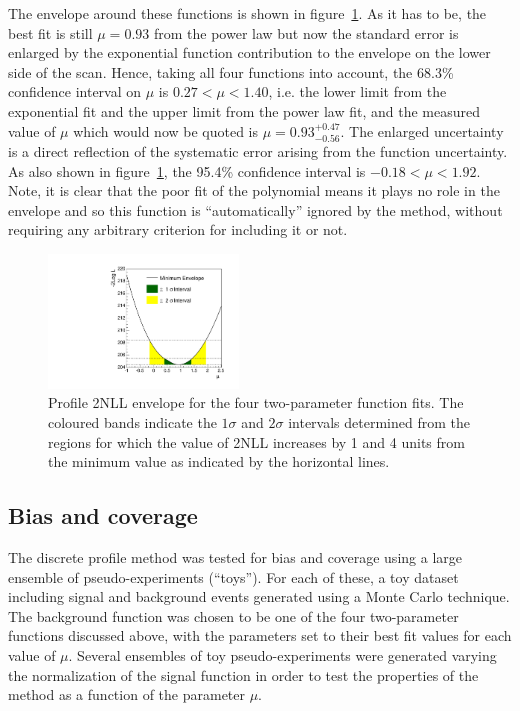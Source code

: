 The envelope around these functions is shown in
figure~\ref{fig:functions:envelope}.
As it has to be, the best fit is still $\mu=0.93$ from the power law
but now the standard error is enlarged by the exponential function
contribution to the
envelope on the lower side of the scan. Hence, taking all four functions into
account, the 68.3\% confidence interval on $\mu$ is
$0.27 < \mu < 1.40 $, i.e. the lower limit from the exponential fit and the
upper limit from the power law fit,
and the measured value of $\mu$ which would now be quoted is 
$\mu = 0.93_{-0.56}^{+0.47}$.
The enlarged uncertainty is a direct reflection of the
systematic error arising from the function uncertainty.
As also shown in figure~\ref{fig:functions:envelope}, the 95.4\% confidence 
interval is $-0.18 < \mu < 1.92$.
Note, it is clear that the poor fit of the polynomial
means it plays no role in the envelope and so this function is 
``automatically'' ignored by the method,
without requiring any arbitrary criterion for
including it or not.
%
\begin{figure}[tbp]
\centering
\includegraphics[width=0.45\textwidth]{functions/Envelope.pdf}
\caption{Profile 2NLL envelope for the four two-parameter function fits.
The coloured bands indicate the $1\sigma$ and $2\sigma$ intervals determined from the regions 
for which the value of 2NLL increases by 1 and 4 units from the minimum value as indicated by the horizontal lines.}
\label{fig:functions:envelope}
\end{figure}


\subsection{Bias and coverage}
\label{sec:functions:coverage}

The discrete profile method was tested for bias and coverage 
using a large ensemble of
pseudo-experiments (``toys''). For each of these, a toy
dataset including signal and background events generated using a Monte Carlo technique. 
The background function was chosen to be one of the four two-parameter functions discussed above, with
the parameters set to their best fit values for each value of $\mu$.
Several ensembles of toy pseudo-experiments were 
generated varying the normalization of the signal function in order to test the properties 
of the method as a function of the parameter $\mu$.  

